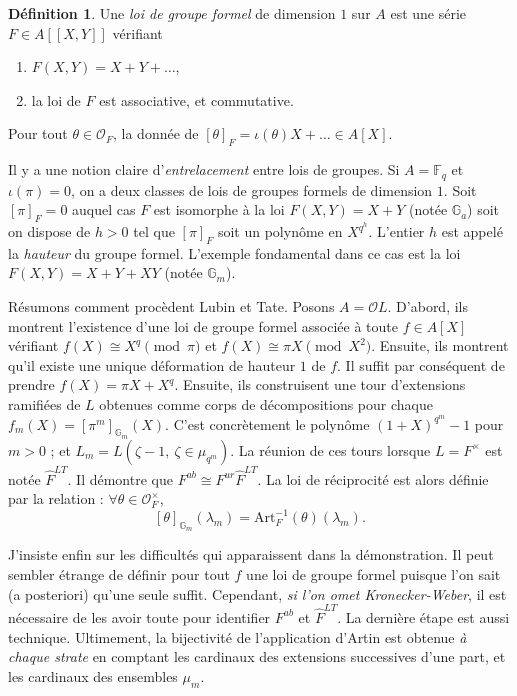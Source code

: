 \documentclass[11.8pt]{amsart}
\theoremstyle{plain}
\theoremstyle{definition}
\newtheorem{defn}[thm]{Définition}
\theoremstyle{remark}
\begin{document}
\begin{defn} Une \textit{loi de groupe formel} de dimension $1$ sur $A$ est une série $F\in A[\![X,Y]\!]$ vérifiant 
\begin{enumerate}
\item $F(X,Y) = X + Y + \ldots$,
\item la loi de $F$ est associative, et commutative. 
\end{enumerate}

Pour tout $\theta \in \mathcal O_F$, la donnée de $[\theta]_F = \iota(\theta) X+ \ldots \in A[X]$. 
\end{defn}

Il y a une notion claire d'\textit{entrelacement} entre lois de groupes. Si $A = \mathbb F_q$ et $\iota(\pi)=0$, on a deux classes de lois de groupes formels de dimension $1$. Soit $[\pi]_F=0$ auquel cas $F$ est isomorphe à la loi $F(X,Y) = X+ Y$ (notée $\mathbb G_a$) soit on dispose de $h>0$ tel que $[\pi]_F$ soit un polynôme en $X^{q^h}$. L'entier $h$ est appelé la \textit{hauteur} du groupe formel. L'exemple fondamental dans ce cas est la loi $F(X,Y) = X+ Y+XY$ (notée $\mathbb G_m$). 
\vspace{10pt}

Résumons comment procèdent Lubin et Tate. Posons $A=\mathcal OL$. D'abord, ils montrent l'existence d'une loi de groupe formel associée à toute $f\in A[X]$ vérifiant $f(X) \cong X^q \pmod \pi$ et $f(X) \cong \pi X \pmod{X^2}$. Ensuite, ils montrent qu'il existe une unique déformation de hauteur $1$ de $f$. Il suffit par conséquent de prendre $f(X) = \pi X + X^q$. Ensuite, ils construisent une tour d'extensions ramifiées de $L$ obtenues comme corps de décompositions pour chaque $f_m(X) = [\pi^m]_{\mathbb G_m}(X)$. C'est concrètement le polynôme $(1+X)^{q^m}-1$ pour $m>0$ ; et $L_m = L(\zeta-1, \ \zeta\in \mu_{q^m})$. La réunion de ces tours lorsque $L = F^\times$ est notée $\hat F^{LT}$. Il démontre que $F^{ab} \cong F^{ur}\hat F^{LT}$. La loi de réciprocité est alors définie par la relation : $\forall \theta \in \mathcal O_F^\times$, $$[\theta]_{\mathbb G_m}(\lambda_m) = \mathrm{Art}_F^{-1}(\theta)(\lambda_m).$$

J'insiste enfin sur les difficultés qui apparaissent dans la démonstration. Il peut sembler étrange de définir pour tout $f$ une loi de groupe formel puisque l'on sait (a posteriori) qu'une seule suffit. Cependant, \textit{si l'on omet Kronecker-Weber}, il est nécessaire de les avoir toute pour identifier $F^{ab}$ et $\hat F^{LT}$. La dernière étape est aussi technique. Ultimement, la bijectivité de l'application d'Artin est obtenue \textit{à chaque strate} en comptant les cardinaux des extensions successives d'une part, et les cardinaux des ensembles $\mu_m$.
\end{document}
